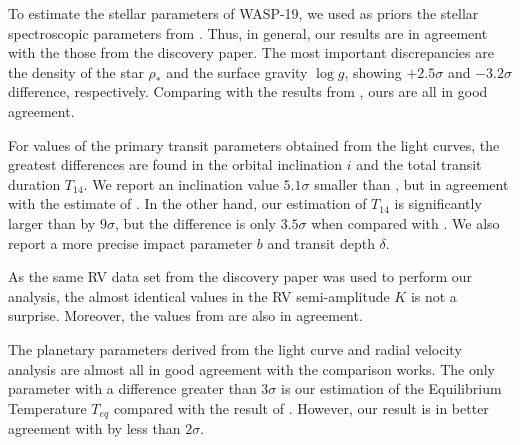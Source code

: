 To estimate the stellar parameters of WASP-19, we used as priors the stellar spectroscopic parameters from \cite{Hebb2010}. Thus, in general, our results are in agreement with the those from the discovery paper. The most important discrepancies are the density of the star $\rho_*$ and the surface gravity $\log{g}$, showing $+2.5\sigma$ and $-3.2\sigma$ difference, respectively. Comparing with the results from \cite{Lendl2013}, ours are all in good agreement.

For values of the primary transit parameters obtained from the light curves, the greatest differences are found in the orbital inclination $i$ and the total transit duration $T_{14}$. We report an inclination value $5.1\sigma$ smaller than \cite{Hebb2010}, but in agreement with the estimate of \cite{Lendl2013}. In the other hand, our estimation of $T_{14}$ is significantly larger than \cite{Hebb2010} by $9\sigma$, but the difference is only $3.5\sigma$ when compared with \cite{Lendl2013}. We also report a more precise impact parameter $b$ and transit depth $\delta$.

As the same RV data set from the discovery paper \citep{Hebb2010} was used to perform our analysis, the almost identical values in the RV semi-amplitude $K$ is not a surprise. Moreover, the values from \cite{Lendl2013} are also in agreement. 

The planetary parameters derived from the light curve and radial velocity analysis are almost all in good agreement with the comparison works. The only parameter with a difference greater than $3\sigma$ is our estimation of the Equilibrium Temperature $T_{eq}$ compared with the result of \cite{Hebb2010}. However, our result is in better agreement with \cite{Lendl2013} by less than $2\sigma$.

